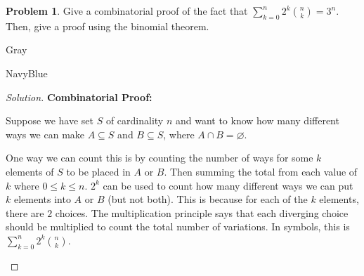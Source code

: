 \documentclass[12pt]{amsart}
\newcounter{problem_number}[section]
\theoremstyle{named}
\newenvironment{soln}
{\begin{color}{Gray}\begin{framed}\begin{color}{NavyBlue}\begin{proof}[Solution]
\doublespacing}
{\end{proof}\end{color}\end{framed}\end{color}}
\theoremstyle{definition}
\newtheorem{problem}{Problem}
\begin{document}
\begin{problem}
	Give a combinatorial proof of the fact that $\displaystyle \sum_{k=0}^n2^k{n\choose k} = 3^n$.
	Then, give a proof using the binomial theorem.
\end{problem}

\begin{soln}
    \phantom{ }

    \textbf{Combinatorial Proof:}

    \begin{adjustwidth}{2em}{0em}





        \noindent Suppose we have set $S$ of cardinality $n$ and want to know how many
        different ways we can make $A \subseteq S$ and $B \subseteq S$,
        where $A \cap B = \varnothing$.

        \phantom{ }

        \noindent One way we can count this is by counting the number of ways for some $k$ elements of $S$
        to be placed in $A$ or $B$. Then summing the total from each value of $k$ where $0 \leq k \leq n$. 
        $2^k$ can be used to count how many different ways we can put $k$ elements into $A$ or $B$ (but not both).
        This is because for each of the $k$ elements, there are $2$ choices. The multiplication principle
        says that each diverging choice should be multiplied to count the total number of variations.
        In symbols, this is $\displaystyle \sum_{k=0}^n2^k{n\choose k}$. 


\end{adjustwidth}
\end{soln}
\end{document}
